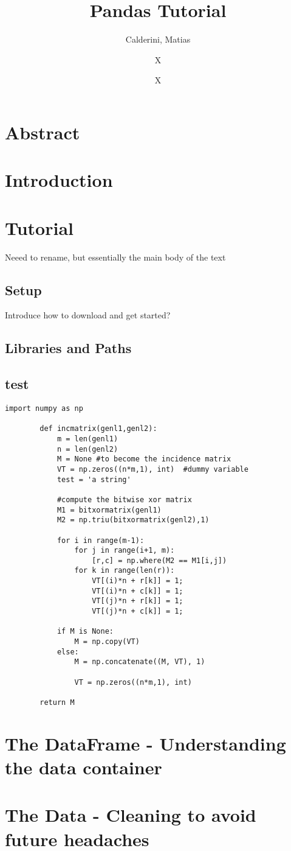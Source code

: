 \documentclass{article}
\title{Pandas Tutorial}
\author[ ]{Calderini, Matias}
\author[1]{X}
\author[2]{X}
\affil[1,2]{University of Ottawa}
\begin{document}
	\maketitle
	\newpage
	
	\tableofcontents
	\listoftables
	\lstlistoflistings
	\newpage
	
	\section{Abstract}
	
	\section{Introduction}
	
	\section{Tutorial}
	Neeed to rename, but essentially the main body of the text
	
	\subsection{Setup}
	 Introduce how to download and get started?
	 
	\subsection{Libraries and Paths}
	
	\subsection{test}
	\begin{lstlisting}[caption=Sample]
		import numpy as np
		
		def incmatrix(genl1,genl2):
			m = len(genl1)
			n = len(genl2)
			M = None #to become the incidence matrix
			VT = np.zeros((n*m,1), int)  #dummy variable
			test = 'a string'
			
			#compute the bitwise xor matrix
			M1 = bitxormatrix(genl1)
			M2 = np.triu(bitxormatrix(genl2),1) 
			
			for i in range(m-1):
				for j in range(i+1, m):
					[r,c] = np.where(M2 == M1[i,j])
				for k in range(len(r)):
					VT[(i)*n + r[k]] = 1;
					VT[(i)*n + c[k]] = 1;
					VT[(j)*n + r[k]] = 1;
					VT[(j)*n + c[k]] = 1;
			
			if M is None:
				M = np.copy(VT)
			else:
				M = np.concatenate((M, VT), 1)
				
				VT = np.zeros((n*m,1), int)
		
		return M
	\end{lstlisting}
	
	\section{The DataFrame - Understanding the data container}
	
	\section{The Data - Cleaning to avoid future headaches}
	
	
	
	
\end{document}
